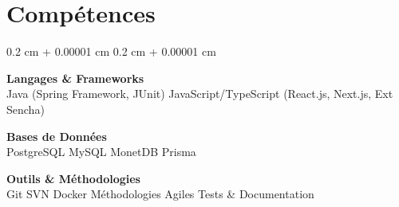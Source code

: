 \documentclass[10pt, letterpaper]{article}
\newenvironment{onecolentry}{
    \begin{adjustwidth}{
        0.2 cm + 0.00001 cm
    }{
        0.2 cm + 0.00001 cm
    }
}{
    \end{adjustwidth}
} %
\begin{document}
    \section{Compétences}
        \begin{onecolentry}
            {\faCode} \textbf{Langages \& Frameworks} \\
            Java (Spring Framework, JUnit) \quad JavaScript/TypeScript (React.js, Next.js, Ext Sencha)
            
            \vspace{0.5 cm}

            {\faDatabase} \textbf{Bases de Données} \\
            PostgreSQL \quad MySQL \quad MonetDB \quad Prisma
            
            \vspace{0.5 cm}

            {\faWrench} \textbf{Outils \& Méthodologies} \\
            Git \quad SVN \quad Docker \quad Méthodologies Agiles \quad Tests \& Documentation
        \end{onecolentry}
\end{document}
